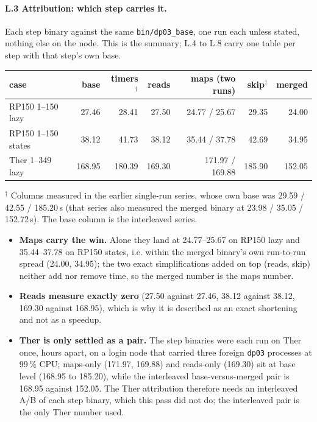 \documentclass[11pt]{article}
\begin{document}
\paragraph{L.3 Attribution: which step carries it.} Each step binary against the same \texttt{bin/dp03\_base}, one run each unless stated, nothing else on the node. This is the summary; L.4 to L.8 carry one table per step with that step's own base.
\begin{center}
\small
\begin{tabular}{@{}lrrrrrr@{}}
\toprule
case & base & timers$^{\dagger}$ & reads & maps (two runs) & skip$^{\dagger}$ & merged \\
\midrule
RP150 1--150 lazy & 27.46 & 28.41 & 27.50 & 24.77 / 25.67 & 29.35 & 24.00 \\
RP150 1--150 states & 38.12 & 41.73 & 38.12 & 35.44 / 37.78 & 42.69 & 34.95 \\
Ther 1--349 lazy & 168.95 & 180.39 & 169.30 & 171.97 / 169.88 & 185.90 & 152.05 \\
\bottomrule
\end{tabular}
\end{center}
{\small $^{\dagger}$ Columns measured in the earlier single-run series, whose own base was 29.59 / 42.55 / 185.20\,s (that series also measured the merged binary at 23.98 / 35.05 / 152.72\,s). The base column is the interleaved series.}
\begin{itemize}[leftmargin=*]
  \item \textbf{Maps carry the win.} Alone they land at 24.77--25.67 on RP150 lazy and 35.44--37.78 on RP150 states, i.e. within the merged binary's own run-to-run spread (24.00, 34.95); the two exact simplifications added on top (reads, skip) neither add nor remove time, so the merged number is the maps number.
  \item \textbf{Reads measure exactly zero} (27.50 against 27.46, 38.12 against 38.12, 169.30 against 168.95), which is why it is described as an exact shortening and not as a speedup.
  \item \textbf{Ther is only settled as a pair.} The step binaries were each run on Ther once, hours apart, on a login node that carried three foreign \texttt{dp03} processes at 99\,\% CPU; maps-only (171.97, 169.88) and reads-only (169.30) sit at base level (168.95 to 185.20), while the interleaved base-versus-merged pair is 168.95 against 152.05. The Ther attribution therefore needs an interleaved A/B of each step binary, which this pass did not do; the interleaved pair is the only Ther number used.
\end{itemize}
\end{document}
